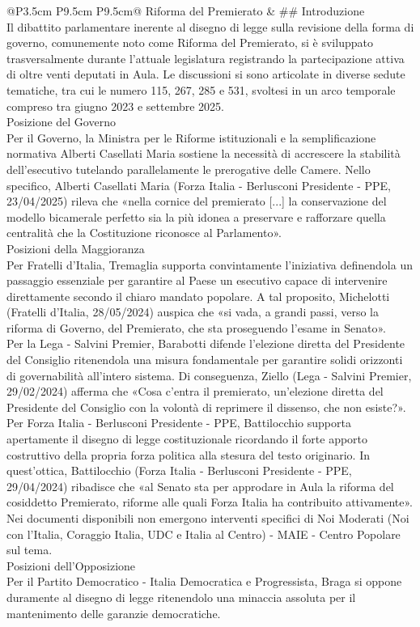 \documentclass[a4paper,11pt]{article}
\begin{document}
\begin{landscape}
\begin{longtable}{@{}P{3.5cm} P{9.5cm} P{9.5cm}@{}}
\midrule
Riforma del Premierato & \#\# Introduzione\\[6pt] Il dibattito parlamentare inerente al disegno di legge sulla revisione della forma di governo, comunemente noto come Riforma del Premierato, si è sviluppato trasversalmente durante l'attuale legislatura registrando la partecipazione attiva di oltre venti deputati in Aula. Le discussioni si sono articolate in diverse sedute tematiche, tra cui le numero 115, 267, 285 e 531, svoltesi in un arco temporale compreso tra giugno 2023 e settembre 2025.\\[6pt] Posizione del Governo\\[6pt] Per il Governo, la Ministra per le Riforme istituzionali e la semplificazione normativa Alberti Casellati Maria sostiene la necessità di accrescere la stabilità dell'esecutivo tutelando parallelamente le prerogative delle Camere. Nello specifico, Alberti Casellati Maria (Forza Italia - Berlusconi Presidente - PPE, 23/04/2025) rileva che «nella cornice del premierato [...] la conservazione del modello bicamerale perfetto sia la più idonea a preservare e rafforzare quella centralità che la Costituzione riconosce al Parlamento».\\[6pt] Posizioni della Maggioranza\\[6pt] Per Fratelli d'Italia, Tremaglia supporta convintamente l'iniziativa definendola un passaggio essenziale per garantire al Paese un esecutivo capace di intervenire direttamente secondo il chiaro mandato popolare. A tal proposito, Michelotti (Fratelli d'Italia, 28/05/2024) auspica che «si vada, a grandi passi, verso la riforma di Governo, del Premierato, che sta proseguendo l'esame in Senato».\\[6pt] Per la Lega - Salvini Premier, Barabotti difende l'elezione diretta del Presidente del Consiglio ritenendola una misura fondamentale per garantire solidi orizzonti di governabilità all'intero sistema. Di conseguenza, Ziello (Lega - Salvini Premier, 29/02/2024) afferma che «Cosa c'entra il premierato, un'elezione diretta del Presidente del Consiglio con la volontà di reprimere il dissenso, che non esiste?».\\[6pt] Per Forza Italia - Berlusconi Presidente - PPE, Battilocchio supporta apertamente il disegno di legge costituzionale ricordando il forte apporto costruttivo della propria forza politica alla stesura del testo originario. In quest'ottica, Battilocchio (Forza Italia - Berlusconi Presidente - PPE, 29/04/2024) ribadisce che «al Senato sta per approdare in Aula la riforma del cosiddetto Premierato, riforme alle quali Forza Italia ha contribuito attivamente».\\[6pt] Nei documenti disponibili non emergono interventi specifici di Noi Moderati (Noi con l'Italia, Coraggio Italia, UDC e Italia al Centro) - MAIE - Centro Popolare sul tema.\\[6pt] Posizioni dell'Opposizione\\[6pt] Per il Partito Democratico - Italia Democratica e Progressista, Braga si oppone duramente al disegno di legge ritenendolo una minaccia assoluta per il mantenimento delle garanzie democratiche. 
\end{longtable}
\end{landscape}
\end{document}
